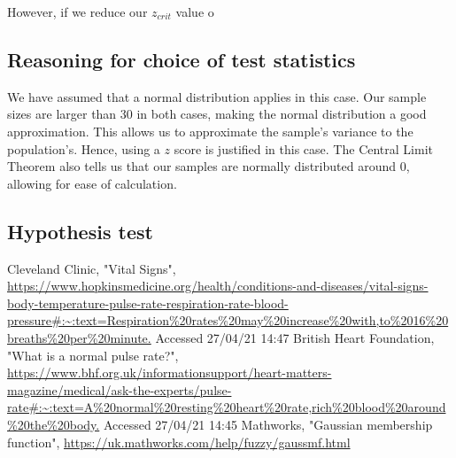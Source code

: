 \documentclass[11pt]{article}
\numberwithin{equation}{section}
\begin{document}
However, if we reduce our $z_{crit}$ value o 
\subsection{Reasoning for choice of test statistics}
We have assumed that a normal distribution applies in this case. Our sample sizes are larger than 30 in both cases, making the normal distribution a good approximation. This allows us to approximate the sample's variance to the population's. Hence, using a $z$ score is justified in this case. The Central Limit Theorem also tells us that our samples are normally distributed around 0, allowing for ease of calculation.
\subsection{Hypothesis test}
\begin{thebibliography}{00}
     Cleveland Clinic, "Vital Signs", \url{https://www.hopkinsmedicine.org/health/conditions-and-diseases/vital-signs-body-temperature-pulse-rate-respiration-rate-blood-pressure#:~:text=Respiration%20rates%20may%20increase%20with,to%2016%20breaths%20per%20minute.} Accessed 27/04/21 14:47
     British Heart Foundation, "What is a normal pulse rate?", \url{https://www.bhf.org.uk/informationsupport/heart-matters-magazine/medical/ask-the-experts/pulse-rate#:~:text=A%20normal%20resting%20heart%20rate,rich%20blood%20around%20the%20body.} Accessed 27/04/21 14:45
     Mathworks, "Gaussian membership function", \url{https://uk.mathworks.com/help/fuzzy/gaussmf.html}
\end{thebibliography}
\end{document}
